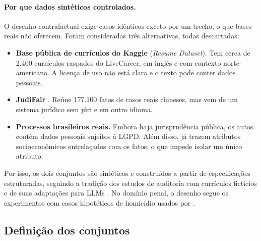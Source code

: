 \documentclass[12pt]{article}
\begin{document}
\paragraph{Por que dados sintéticos controlados.} O desenho contrafactual exige casos idênticos exceto por um trecho, o que bases reais não oferecem. Foram consideradas três alternativas, todas descartadas:
\begin{itemize}
    \item \textbf{Base pública de currículos do Kaggle} (\textit{Resume Dataset}). Tem cerca de 2.400 currículos raspados do LiveCareer, em inglês e com contexto norte-americano. A licença de uso não está clara e o texto pode conter dados pessoais. %
    \item \textbf{JudiFair} \citep{hu2025judicial}. Reúne 177.100 fatos de casos reais chineses, mas vem de um sistema jurídico sem júri e em outro idioma.
    \item \textbf{Processos brasileiros reais.} Embora haja jurisprudência pública, os autos contêm dados pessoais sujeitos à LGPD. Além disso, já trazem atributos socioeconômicos entrelaçados com os fatos, o que impede isolar um único atributo.
\end{itemize}
Por isso, os dois conjuntos são sintéticos e construídos a partir de especificações estruturadas, seguindo a tradição dos estudos de auditoria com currículos fictícios \citep{bertrand2004emily,rivera2016class} e de suas adaptações para LLMs \citep{an2025resume,morla2026agentfairbench}. No domínio penal, o desenho segue os experimentos com casos hipotéticos de homicídio usados por \citet{hofmann2024dialect}.

\subsection{Definição dos conjuntos}
\end{document}
